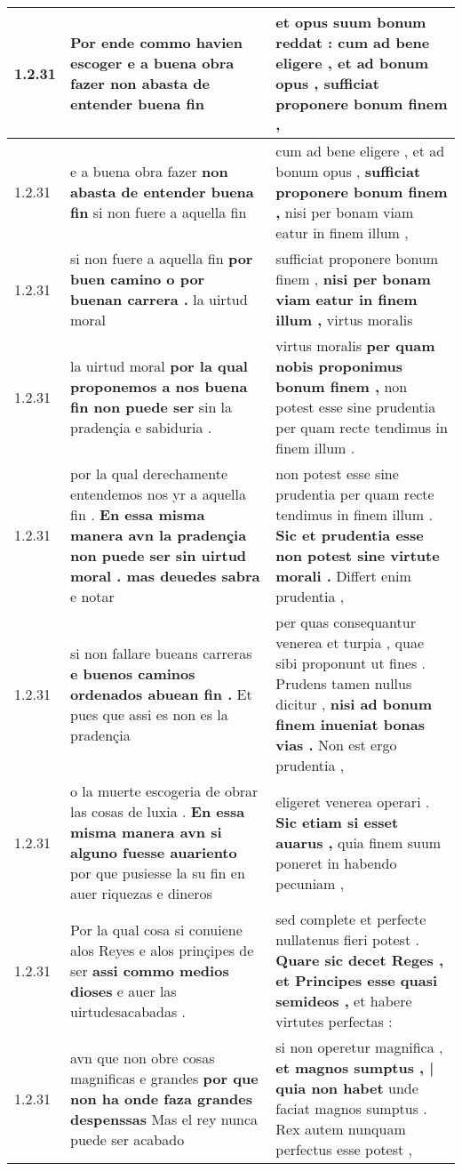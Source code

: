 \begin{tabular}{|p{1cm}|p{6.5cm}|p{6.5cm}|}
1.2.31 & Por ende commo havien escoger \textbf{ e a buena obra fazer } non abasta de entender buena fin & et opus suum bonum reddat : \textbf{ cum ad bene eligere , et ad bonum opus , } sufficiat proponere bonum finem , \\\hline
1.2.31 & e a buena obra fazer \textbf{ non abasta de entender buena fin } si non fuere a aquella fin & cum ad bene eligere , et ad bonum opus , \textbf{ sufficiat proponere bonum finem , } nisi per bonam viam eatur in finem illum , \\\hline
1.2.31 & si non fuere a aquella fin \textbf{ por buen camino o por buenan carrera . } la uirtud moral & sufficiat proponere bonum finem , \textbf{ nisi per bonam viam eatur in finem illum , } virtus moralis \\\hline
1.2.31 & la uirtud moral \textbf{ por la qual proponemos a nos buena fin non puede ser } sin la pradençia e sabiduria . & virtus moralis \textbf{ per quam nobis proponimus bonum finem , } non potest esse sine prudentia per quam recte tendimus in finem illum . \\\hline
1.2.31 & por la qual derechamente entendemos nos yr a aquella fin . \textbf{ En essa misma manera avn la pradençia non puede ser sin uirtud moral . mas deuedes sabra } e notar & non potest esse sine prudentia per quam recte tendimus in finem illum . \textbf{ Sic et prudentia esse non potest sine virtute morali . } Differt enim prudentia , \\\hline
1.2.31 & si non fallare bueans carreras \textbf{ e buenos caminos ordenados abuean fin . } Et pues que assi es non es la pradençia & per quas consequantur venerea et turpia , quae sibi proponunt ut fines . Prudens tamen nullus dicitur , \textbf{ nisi ad bonum finem inueniat bonas vias . } Non est ergo prudentia , \\\hline
1.2.31 & o la muerte escogeria de obrar las cosas de luxia . \textbf{ En essa misma manera avn si alguno fuesse auariento } por que pusiesse la su fin en auer riquezas e dineros & eligeret venerea operari . \textbf{ Sic etiam si esset auarus , } quia finem suum poneret in habendo pecuniam , \\\hline
1.2.31 & Por la qual cosa si conuiene alos Reyes e alos prinçipes de ser \textbf{ assi commo medios dioses } e auer las uirtudesacabadas . & sed complete et perfecte nullatenus fieri potest . \textbf{ Quare sic decet Reges , et Principes esse quasi semideos , } et habere virtutes perfectas : \\\hline
1.2.31 & avn que non obre cosas magnificas e grandes \textbf{ por que non ha onde faza grandes despenssas } Mas el rey nunca puede ser acabado & si non operetur magnifica , \textbf{ et magnos sumptus , | quia non habet } unde faciat magnos sumptus . Rex autem nunquam perfectus esse potest , \\\hline

\end{tabular}
